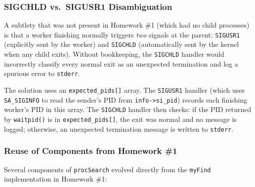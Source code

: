 \documentclass[12pt,a4paper]{article}
\begin{document}
\subsubsection{SIGCHLD vs.\ SIGUSR1 Disambiguation}

A subtlety that was not present in Homework \#1 (which had no child processes)
is that a worker finishing normally triggers \textit{two} signals at the parent:
\texttt{SIGUSR1} (explicitly sent by the worker) and \texttt{SIGCHLD}
(automatically sent by the kernel when any child exits). Without bookkeeping,
the \texttt{SIGCHLD} handler would incorrectly classify every normal exit as
an unexpected termination and log a spurious error to \texttt{stderr}.

The solution uses an \texttt{expected\_pids[]} array. The \texttt{SIGUSR1}
handler (which uses \texttt{SA\_SIGINFO} to read the sender's PID from
\texttt{info->si\_pid}) records each finishing worker's PID in this array.
The \texttt{SIGCHLD} handler then checks: if the PID returned by
\texttt{waitpid()} is in \texttt{expected\_pids[]}, the exit was normal and
no message is logged; otherwise, an unexpected termination message is written
to \texttt{stderr}.

\subsubsection{Reuse of Components from Homework \#1}

Several components of \texttt{procSearch} evolved directly from the
\texttt{myFind} implementation in Homework \#1:
\end{document}
